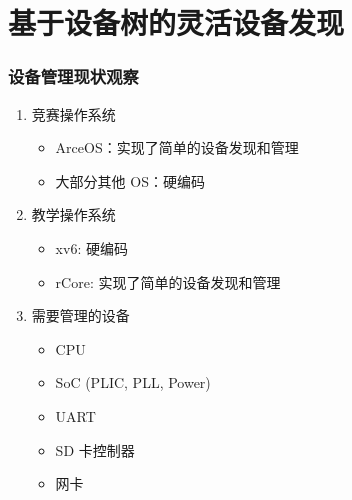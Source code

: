 \section{基于设备树的灵活设备发现}

\begin{frame}
    \frametitle{设备管理现状观察}

    \begin{enumerate}
        \item 竞赛操作系统
              \begin{itemize}
                  \item ArceOS：实现了简单的设备发现和管理
                  \item 大部分其他 OS：硬编码
              \end{itemize}
        \item 教学操作系统
              \begin{itemize}
                  \item xv6: 硬编码
                  \item rCore: 实现了简单的设备发现和管理
              \end{itemize}
        \item 需要管理的设备
              \begin{itemize}
                  \item CPU
                  \item SoC (PLIC, PLL, Power)
                  \item UART
                  \item SD 卡控制器
                  \item 网卡
              \end{itemize}

    \end{enumerate}

\end{frame}

